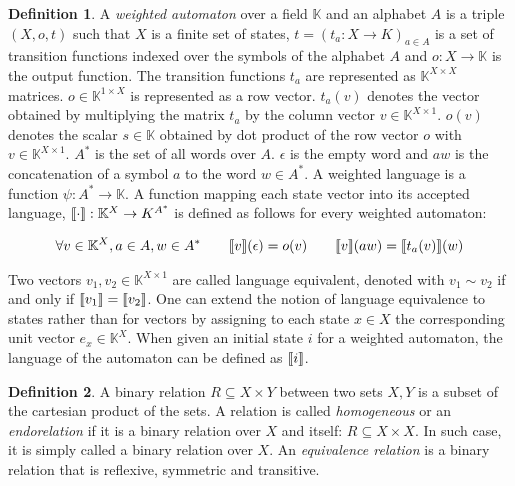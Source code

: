 \documentclass{article}
\theoremstyle{plain}%
\theoremstyle{definition}
\newtheorem{defn}{Definition}[section]
\theoremstyle{remark}
\def\K{\mathbb{K}}
\DeclarePairedDelimiter\sqmap{\llbracket}{\rrbracket}
\begin{document}
\begin{defn}
  A \textit{weighted automaton} over a field $\K$ and an alphabet $A$ is a triple 
  $(X,o,t)$ such that $X$ is a finite set of states, $t = (t_a : X \to K)_{a \in A}$
  is a set of transition functions indexed over the symbols of the alphabet $A$ and $o : X 
  \to \K$ is the output function. The transition functions $t_a$ are represented as
  $\K^{X \times X}$ matrices. $o \in \K^{1 \times X}$ is represented as a row vector.
  $t_a(v)$ denotes the vector obtained by multiplying the matrix $t_a$ by the column 
  vector $v  \in \K^{X \times 1}$. $o(v)$ denotes the scalar $s \in \K$ obtained by 
  dot product of the row vector $o$ with $v \in \K^{X \times 1}$.
  $A^*$ is the set of all words over $A$. $\epsilon$ is the empty word and $aw$ is the
  concatenation of a symbol $a$ to the word $w \in A^*$.
  A weighted language is a function $\psi: A^* \to \K$.
  A function mapping each state vector into its 
  accepted language, $\sqmap{\cdot}: \K^X \to K^{A^*}$ is defined as follows for every weighted automaton:

  \begin{equation*}
    \begin{aligned}
      \forall v \in \K^X, a \in A, w \in A^* \quad \quad
      \sqmap{v}(\epsilon) = o(v) \quad \quad
      \sqmap{v}(aw) = \sqmap{t_a(v)}(w)  
    \end{aligned}
  \end{equation*}

  Two vectors $v_1, v_2 \in \K^{X\times 1}$ are called language equivalent, denoted with 
  $v_1 \sim v_2 $ if and only if $ \sqmap
  {v_1} = \sqmap{v_2}$. One can extend the notion of language equivalence to states rather
  than for vectors by assigning to each state $x \in X$ the corresponding unit vector 
  $e_x \in \K^X$. When given an initial state $i$ for a weighted automaton, the language 
  of the automaton can be defined as $\sqmap{i}$.
\end{defn}


\begin{defn}
  A binary relation $R \subseteq X \times Y$ between two sets $X, Y$ is a subset of the 
  cartesian product of the sets. A relation is called \textit{homogeneous} or an \textit
  {endorelation} if it is a binary relation over $X$ and itself: $R \subseteq X \times
   X$. 
  In such case, it is simply called a binary relation over $X$.
  An \textit{equivalence relation} is a binary relation that is reflexive, symmetric and
  transitive. 
\end{defn}
  
\end{document}
